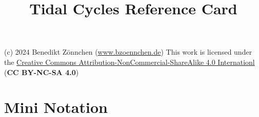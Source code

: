 \documentclass[8pt]{extarticle} %
\begin{document}
	\raggedright
	
	\begin{multicols}{2}
		
		\title{\color{tiltecolor}Tidal Cycles Reference Card}

		{\small
			(c) 2024 Benedikt Z{\"onnchen} (\href{www.bzoennchen.de}{www.bzoennchen.de})
			This work is licensed under the \href{https://creativecommons.org/licenses/by-nc-sa/4.0/}{Creative Commons Attribution-NonCommercial-ShareAlike 4.0 Internationl} (\textbf{CC BY-NC-SA 4.0})
		}
		
		\vspace*{7pt}
		
		\section{Mini Notation}
		

\end{multicols}
\end{document}
